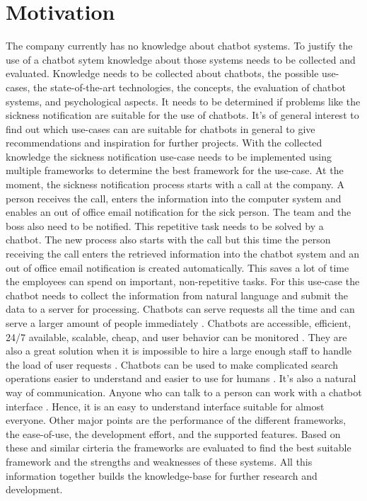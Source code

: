 \section{Motivation} %
The company currently has no knowledge about chatbot systems.
To justify the use of a chatbot sytem knowledge about those systems needs to be collected and evaluated.
Knowledge needs to be collected about chatbots, the possible use-cases, the state-of-the-art technologies, the concepts, 
the evaluation of chatbot systems, and psychological aspects.
It needs to be determined if problems like the sickness notification are suitable for the use of chatbots.
It's of general interest to find out which use-cases can are suitable for chatbots in general to give
recommendations and inspiration for further projects.
With the collected knowledge the sickness notification use-case needs to be implemented using multiple frameworks to determine 
the best framework for the use-case.
At the moment, the sickness notification process starts with a call at the company. 
A person receives the call, enters the information into the computer system and enables an out of office email 
notification for the sick person. 
The team and the boss also need to be notified. 
This repetitive task needs to be solved by a chatbot. 
The new process also starts with the call but this time the person receiving the call enters 
the retrieved information into the chatbot system and an out of office email 
notification is created automatically. 
This saves a lot of time the employees can spend on important, non-repetitive tasks.
For this use-case the chatbot needs to collect the information from natural language 
and submit the data to a server for processing.
Chatbots can serve requests all the time and can serve a larger amount of people immediately \cite{kane2016role}.
Chatbots are accessible, efficient, 24/7 available, scalable, cheap, and user behavior can be monitored \cite{buiildChatbotsPython}.
They are also a great solution when it is impossible to hire a large enough staff to handle the load of user requests \cite{kane2016role}.
Chatbots can be used to make complicated search operations easier to understand and easier to use for humans \cite{kane2016role}.
It's also a natural way of communication.
Anyone who can talk to a person can work with a chatbot interface \cite{buiildChatbotsPython}.
Hence, it is an easy to understand interface suitable for almost everyone.
Other major points are the performance of the different frameworks, the ease-of-use, 
the development effort, and the supported features.
Based on these and similar cirteria the frameworks are evaluated to find the best suitable 
framework and the strengths and weaknesses of these systems.
All this information together builds the knowledge-base for further research and development.

